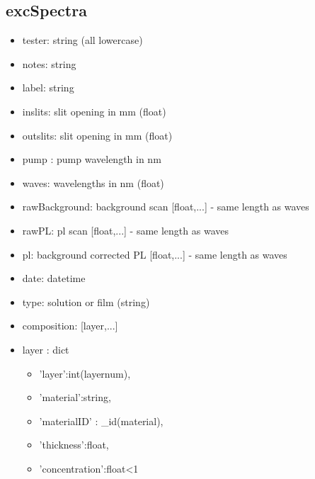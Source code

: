 \documentclass[../thesis.tex]{subfiles}
\begin{document}
\subsection{excSpectra}
\begin{itemize}
\item tester: string (all lowercase)
\item notes: string
\item label: string
\item inslits: slit opening in mm (float)
\item outslits: slit opening in mm (float)
\item pump : pump wavelength in nm
\item waves: wavelengths in nm (float)
\item rawBackground: background scan [float,...] - same length as waves
\item rawPL: pl scan [float,...] - same length as waves
\item pl: background corrected PL [float,...] - same length as waves
\item date: datetime
\item type: solution or film (string)
\item composition: [layer,...]
\item layer : dict
\begin{itemize}

\item 'layer':int(layernum),
\item 'material':string,
\item 'materialID' : \_id(material),
\item 'thickness':float,
\item 'concentration':float<1 
\end{itemize}
\end{itemize}
\end{document}
